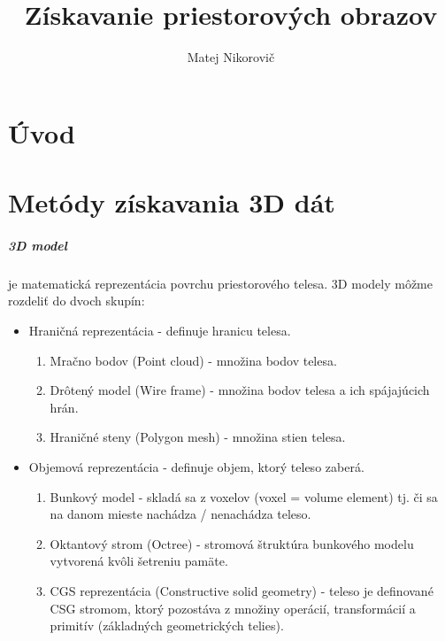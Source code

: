 \documentclass[thesismargins, thesislinespacing, twoside, upjsfrontpage]{rnthesis}
\title{Získavanie priestorových obrazov}
\author{Matej Nikorovič}
\begin{document}
\maketitle
\newpage
\tableofcontents
\listoffigures
\listoftables

\chapter*{Úvod}

\chapter{Metódy získavania 3D dát}

\paragraph{3D model} je matematická reprezentácia povrchu priestorového telesa. 3D modely môžme rozdeliť do dvoch skupín:
\begin{itemize}
	\item Hraničná reprezentácia - definuje hranicu telesa. %
	\begin{enumerate}
		\item Mračno bodov (Point cloud) - množina bodov telesa.
		\item Drôtený model (Wire frame) - množina bodov telesa a ich spájajúcich hrán.
		\item Hraničné steny (Polygon mesh) - množina stien telesa.
	\end{enumerate}
	\item Objemová reprezentácia - definuje objem, ktorý teleso zaberá. %
	\begin{enumerate}
		\item Bunkový model - skladá sa z voxelov (voxel = volume element) tj. či sa na danom mieste nachádza / nenachádza teleso.
		\item Oktantový strom (Octree) - stromová štruktúra bunkového modelu vytvorená kvôli šetreniu pamäte.
		\item CGS reprezentácia (Constructive solid geometry) - teleso je definované CSG stromom, ktorý pozostáva z množiny operácií, transformácií a primitív (základných geometrických telies).
	\end{enumerate}
\end{itemize}
\end{document}
